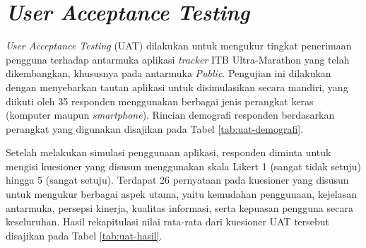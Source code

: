 
\section{\textit{User Acceptance Testing}}
\textit{User Acceptance Testing} (UAT) dilakukan untuk mengukur tingkat penerimaan pengguna terhadap antarmuka aplikasi \textit{tracker} ITB Ultra-Marathon yang telah dikembangkan, khususnya pada antarmuka \textit{Public}. Pengujian ini dilakukan dengan menyebarkan tautan aplikasi untuk disimulasikan secara mandiri, yang diikuti oleh 35 responden menggunakan berbagai jenis perangkat keras (komputer maupun \textit{smartphone}). Rincian demografi responden berdasarkan perangkat yang digunakan disajikan pada Tabel \ref{tab:uat-demografi}.



Setelah melakukan simulasi penggunaan aplikasi, responden diminta untuk mengisi kuesioner yang disusun menggunakan skala Likert 1 (sangat tidak setuju) hingga 5 (sangat setuju). Terdapat 26 pernyataan pada kuesioner yang disusun untuk mengukur berbagai aspek utama, yaitu kemudahan penggunaan, kejelasan antarmuka, persepsi kinerja, kualitas informasi, serta kepuasan pengguna secara keseluruhan. Hasil rekapitulasi nilai rata-rata dari kuesioner UAT tersebut disajikan pada Tabel \ref{tab:uat-hasil}.



